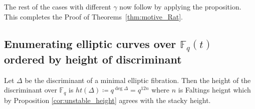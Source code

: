\documentclass[a4paper,12pt]{amsart}
\theoremstyle{definition}
\newcommand{\cW}{\mathcal{W}}
\newcommand{\Pb}{\mathbb{P}}
\newcommand{\Fb}{\mathbb{F}}
\newcommand{\Gb}{\mathbb{G}}
\newcommand{\Lb}{\mathbb{L}}
\begin{document}

	The rest of the cases with different $\gamma$ now follow by applying the proposition. This completes the Proof of Theorems~\ref{thm:motive_Rat}.
	
	
	
	\subsection{Enumerating elliptic curves over \texorpdfstring{$\Fb_q(t)$}{PP\textasciicircum1} ordered by height of discriminant}
	
	Let $\Delta$ be the discriminant of a minimal elliptic fibration. Then the height of the discriminant over $\Fb_q$ is $ht(\Delta) \coloneqq q^{\deg \Delta} = q^{12n}$ where $n$ is Faltings heignt which by Proposition \ref{cor:unstable_height} agrees with the stacky height. 
	
\end{document}
